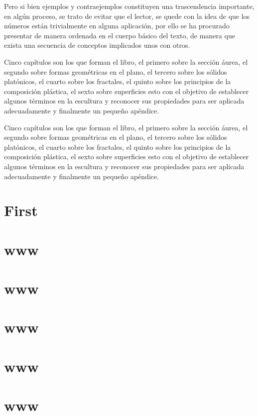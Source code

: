 \documentclass[12pt,a4paper]{book}
\begin{document}
Pero si bien ejemplos y contraejemplos constituyen una trascendencia
importante, en algún proceso, se trato de evitar que el lector, se quede con
la idea de que los números están trivialmente en alguna aplicación, por
ello se ha procurado presentar de manera ordenada en el cuerpo básico del
texto, de manera que exista una secuencia de conceptos implicados unos
con otros.

Cinco capítulos son los que forman el libro, el primero sobre la sección
áurea, el segundo sobre formas geométricas en el plano, el tercero sobre los
sólidos platónicos, el cuarto sobre los fractales, el quinto sobre los principios
de la composición plástica, el sexto sobre superficies esto con el objetivo de
establecer algunos términos en la escultura y reconocer sus propiedades
para ser aplicada adecuadamente y finalmente un pequeño apéndice.

Cinco capítulos son los que forman el libro, el primero sobre la sección
áurea, el segundo sobre formas geométricas en el plano, el tercero sobre los
sólidos platónicos, el cuarto sobre los fractales, el quinto sobre los principios
de la composición plástica, el sexto sobre superficies esto con el objetivo de
establecer algunos términos en la escultura y reconocer sus propiedades
para ser aplicada adecuadamente y finalmente un pequeño apéndice.
\chapter{First}



\printindex

\appendix
{}
\setcounter{page}{1}
\chapter{www}
\chapter{www}
\chapter{www}
\chapter{www}
\chapter{www}
\end{document}
